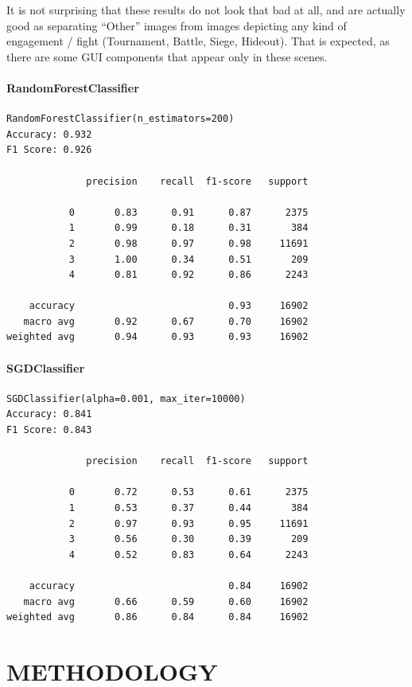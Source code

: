 \documentclass[
]{article}
\begin{document}
It is not surprising that these results do not look that bad at all, and
are actually good as separating ``Other'' images from images depicting
any kind of engagement / fight (Tournament, Battle, Siege, Hideout).
That is expected, as there are some GUI components that appear only in
these scenes.

\hypertarget{randomforestclassifier}{%
\paragraph{RandomForestClassifier}\label{randomforestclassifier}}

\begin{verbatim}
RandomForestClassifier(n_estimators=200)
Accuracy: 0.932
F1 Score: 0.926

              precision    recall  f1-score   support

           0       0.83      0.91      0.87      2375
           1       0.99      0.18      0.31       384
           2       0.98      0.97      0.98     11691
           3       1.00      0.34      0.51       209
           4       0.81      0.92      0.86      2243

    accuracy                           0.93     16902
   macro avg       0.92      0.67      0.70     16902
weighted avg       0.94      0.93      0.93     16902
\end{verbatim}


\hypertarget{sgdclassifier}{%
\paragraph{SGDClassifier}\label{sgdclassifier}}

\begin{verbatim}
SGDClassifier(alpha=0.001, max_iter=10000)
Accuracy: 0.841
F1 Score: 0.843

              precision    recall  f1-score   support

           0       0.72      0.53      0.61      2375
           1       0.53      0.37      0.44       384
           2       0.97      0.93      0.95     11691
           3       0.56      0.30      0.39       209
           4       0.52      0.83      0.64      2243

    accuracy                           0.84     16902
   macro avg       0.66      0.59      0.60     16902
weighted avg       0.86      0.84      0.84     16902
\end{verbatim}


\hypertarget{methodology}{%
\section{METHODOLOGY}\label{methodology}}
\end{document}
